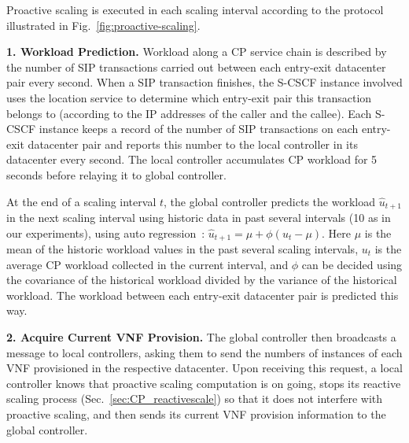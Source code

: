 Proactive scaling is executed in each scaling interval according to the protocol illustrated in Fig.~\ref{fig:proactive-scaling}.

\vspace{1mm}
\noindent\textbf{1. Workload Prediction.}
Workload along a CP service chain is described by the number of SIP transactions carried out between each entry-exit datacenter pair every second. When a SIP transaction finishes, the S-CSCF instance involved uses the location service to determine which entry-exit pair this transaction belongs to (according to the IP addresses of the caller and the callee). Each S-CSCF instance keeps a record of the number of SIP transactions on each entry-exit datacenter pair and reports this number to the local controller in its datacenter every second. The local controller accumulates CP workload for 5 seconds before relaying it to global controller.

At the end of a scaling interval $t$, the global controller predicts the workload $\hat{u}_{t+1}$ in the next scaling interval using historic data in past several intervals (10 as in our experiments), using auto regression~\cite{wood2007black}: $\hat{u}_{t+1} = \mu + \phi(u_t-\mu)$.
Here $\mu$ is the mean of the historic workload values in the past several scaling intervals, $u_t$ is the average CP workload collected in the current interval, and $\phi$ can be decided using the covariance of the historical workload divided by the variance of the historical workload. The workload between each entry-exit datacenter pair is predicted this way.

\vspace{1mm}
\noindent\textbf{2. Acquire Current VNF Provision.} The global controller then broadcasts a message to local controllers, asking them to send %
 the numbers of instances of each VNF provisioned in the respective datacenter. Upon receiving this request, a local controller knows that proactive scaling computation is on going, stops its reactive scaling process (Sec.~\ref{sec:CP_reactivescale}) so that it does not interfere with proactive scaling, and then sends its current VNF provision information to the global controller.

